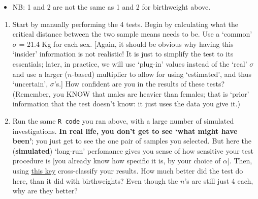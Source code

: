 \documentclass[]{book}
\newenvironment{Shaded}{\begin{snugshade}}{\end{snugshade}}
\newcommand{\DataTypeTok}[1]{\textcolor[rgb]{0.13,0.29,0.53}{#1}}
\newcommand{\DecValTok}[1]{\textcolor[rgb]{0.00,0.00,0.81}{#1}}
\newcommand{\FloatTok}[1]{\textcolor[rgb]{0.00,0.00,0.81}{#1}}
\newcommand{\KeywordTok}[1]{\textcolor[rgb]{0.13,0.29,0.53}{\textbf{#1}}}
\newcommand{\NormalTok}[1]{#1}
\newcommand{\OperatorTok}[1]{\textcolor[rgb]{0.81,0.36,0.00}{\textbf{#1}}}
\newcommand{\StringTok}[1]{\textcolor[rgb]{0.31,0.60,0.02}{#1}}
\providecommand{\tightlist}{%
  \setlength{\itemsep}{0pt}\setlength{\parskip}{0pt}}
\begin{document}
\begin{itemize}
\tightlist
\item
  NB: 1 and 2 are not the same as 1 and 2 for birthweight above.
\end{itemize}

\begin{enumerate}
\def\labelenumi{\arabic{enumi}.}
\setcounter{enumi}{5}
\item
  Start by manually performing the 4 tests. Begin by calculating what the critical distance between the two sample means needs to be. Use a `common' \(\sigma\) = 21.4 Kg for each sex. {[}Again, it should be obvious why having this `insider' information is not realistic! It is just to simplify the test to its essentials; later, in practice, we will use `plug-in' values instead of the `real' \(\sigma\) and use a larger (\(n\)-based) multiplier to allow for using `estimated', and thus `uncertain', \(\sigma\)'s.{]} How confident are you in the results of these tests? (Remember, you KNOW that males are heavier than females; that is `prior' information that the test doesn't know: it just uses the data you give it.)
\item
  Run the same \texttt{R\ code} you ran above, with a large number of simulated investigations. \textbf{In real life, you don't get to see `what might have been'}; you just get to see the one pair of samples you selected. But here the (\textbf{simulated}) `long-run' perfomance gives you sense of how sensitive your test procedure is {[}you already know how specific it is, by your choice of \(\alpha\){]}. Then, using \href{http://www.biostat.mcgill.ca/hanley/statbook/4panelsOfSexSpecificAdultWeights.txt}{this key} cross-classify your results. How much better did the test do here, than it did with birthweights? Even though the \(n\)'s are still just 4 each, why are they better?
\end{enumerate}

\begin{Shaded}
\end{Shaded}
\end{document}
